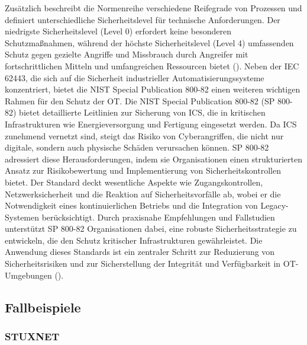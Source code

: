 Zusätzlich beschreibt die Normenreihe verschiedene Reifegrade von Prozessen und definiert unterschiedliche Sicherheitslevel für technische Anforderungen. Der niedrigste Sicherheitslevel (Level 0) erfordert keine besonderen Schutzmaßnahmen, während der höchste Sicherheitslevel (Level 4) umfassenden Schutz gegen gezielte Angriffe und Missbrauch durch Angreifer mit fortschrittlichen Mitteln und umfangreichen Ressourcen bietet (\cite{ISecInsider}). Neben der IEC 62443, die sich auf die Sicherheit industrieller Automatisierungssysteme konzentriert, bietet die NIST Special Publication 800-82 einen weiteren wichtigen Rahmen für den Schutz der OT. Die NIST Special Publication 800-82 (SP 800-82) bietet detaillierte Leitlinien zur Sicherung von ICS, die in kritischen Infrastrukturen wie Energieversorgung und Fertigung eingesetzt werden. Da ICS zunehmend vernetzt sind, steigt das Risiko von Cyberangriffen, die nicht nur digitale, sondern auch physische Schäden verursachen können. SP 800-82 adressiert diese Herausforderungen, indem sie Organisationen einen strukturierten Ansatz zur Risikobewertung und Implementierung von Sicherheitskontrollen bietet. Der Standard deckt wesentliche Aspekte wie Zugangskontrollen, Netzwerksicherheit und die Reaktion auf Sicherheitsvorfälle ab, wobei er die Notwendigkeit eines kontinuierlichen Betriebs und die Integration von Legacy-Systemen berücksichtigt. Durch praxisnahe Empfehlungen und Fallstudien unterstützt SP 800-82 Organisationen dabei, eine robuste Sicherheitsstrategie zu entwickeln, die den Schutz kritischer Infrastrukturen gewährleistet. Die Anwendung dieses Standards ist ein zentraler Schritt zur Reduzierung von Sicherheitsrisiken und zur Sicherstellung der Integrität und Verfügbarkeit in OT-Umgebungen (\cite{NIST}).

\subsection{Fallbeispiele}
\subsubsection{STUXNET}


